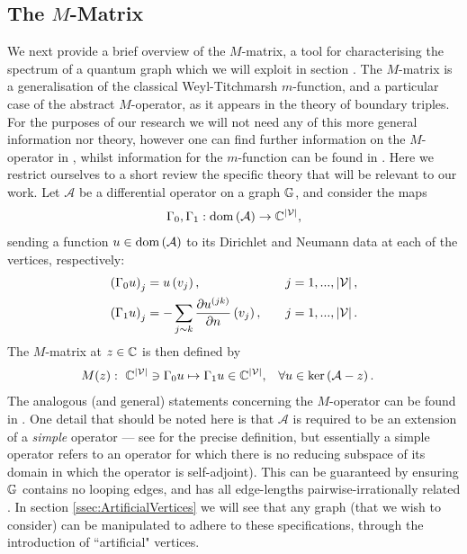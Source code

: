\subsection{The $M$-Matrix} \label{ssec:MMatrix}
We next provide a brief overview of the $M$-matrix, a tool for characterising the spectrum of a quantum graph which we will exploit in section .
The $M$-matrix is a generalisation of the classical Weyl-Titchmarsh $m$-function, and a particular case of the abstract $M$-operator, as it appears in the theory of boundary triples.
For the purposes of our research we will not need any of this more general information nor theory, however one can find further information on the $M$-operator in \cite{kochubei1975extensions, kochubei1980characteristic, gorbachuk1991boundary, brown2008boundary, brown2020functional, cherednichenko2020scattering, cherednichenko2018functional}, whilst information for the $m$-function can be found in \cite{titchmarsh1962eigenfunction, atkinson1964discrete}.
Here we restrict ourselves to a short review the specific theory that will be relevant to our work.
Let $\mathcal{A}$ be a differential operator on a graph $\mathbb{G}$, and consider the maps
\begin{align*}
	\Gamma_0, \Gamma_1: \mathrm{dom}\left( \mathcal{A} \right) \rightarrow \mathbb{C}^{\left\lvert \mathcal{V} \right\rvert},
\end{align*}
sending a function $u\in\mathrm{dom}\left( \mathcal{A} \right)$ to its Dirichlet and Neumann data at each of the vertices, respectively:
\begin{align*}
	\left( \Gamma_0 u \right)_j &= u\left( v_j \right), \quad &j=1,...,\left\lvert \mathcal{V} \right\rvert, \\
	\left( \Gamma_1 u \right)_j &= -\sum_{j\sim k}\dfrac{\partial u^{(jk)}}{\partial n}\left( v_j \right), \quad &j=1,...,\left\lvert \mathcal{V} \right\rvert. 
\end{align*}
The $M$-matrix at $z\in\mathbb{C}$ is then defined by
\begin{align*}
	M(z): \ \mathbb{C}^{\left\lvert \mathcal{V} \right\rvert} \ni \Gamma_0 u \mapsto \Gamma_1 u \in \mathbb{C}^{\left\lvert \mathcal{V} \right\rvert},
	 &\quad \forall u\in\mathrm{ker}\left( \mathcal{A}-z \right).
\end{align*}
The analogous (and general) statements concerning the $M$-operator can be found in \cite{derkach1991generalized, derkach2014boundary}.
One detail that should be noted here is that $\mathcal{A}$ is required to be an extension of a \emph{simple} operator --- see \cite[Section 2.2]{ershova2014isospectrality} for the precise definition, but essentially a simple operator refers to an operator for which there is no reducing subspace of its domain in which the operator is self-adjoint).
This can be guaranteed by ensuring $\mathbb{G}$ contains no looping edges, and has all edge-lengths pairwise-irrationally related \cite{ashurova2014simplicity}.
In section \ref{ssec:ArtificialVertices} we will see that any graph (that we wish to consider) can be manipulated to adhere to these specifications, through the introduction of ``artificial" vertices.

